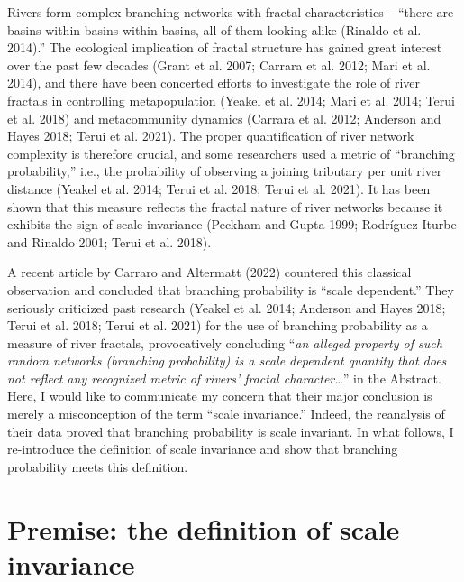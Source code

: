 \documentclass[
  12pt,
]{article}
\begin{document}
Rivers form complex branching networks with fractal characteristics -- ``there are basins within basins within basins, all of them looking alike (Rinaldo et al. 2014).'' The ecological implication of fractal structure has gained great interest over the past few decades (Grant et al. 2007; Carrara et al. 2012; Mari et al. 2014), and there have been concerted efforts to investigate the role of river fractals in controlling metapopulation (Yeakel et al. 2014; Mari et al. 2014; Terui et al. 2018) and metacommunity dynamics (Carrara et al. 2012; Anderson and Hayes 2018; Terui et al. 2021). The proper quantification of river network complexity is therefore crucial, and some researchers used a metric of ``branching probability,'' i.e., the probability of observing a joining tributary per unit river distance (Yeakel et al. 2014; Terui et al. 2018; Terui et al. 2021). It has been shown that this measure reflects the fractal nature of river networks because it exhibits the sign of scale invariance (Peckham and Gupta 1999; Rodríguez-Iturbe and Rinaldo 2001; Terui et al. 2018).

A recent article by Carraro and Altermatt (2022) countered this classical observation and concluded that branching probability is ``scale dependent.'' They seriously criticized past research (Yeakel et al. 2014; Anderson and Hayes 2018; Terui et al. 2018; Terui et al. 2021) for the use of branching probability as a measure of river fractals, provocatively concluding ``\emph{an alleged property of such random networks (branching probability) is a scale dependent quantity that does not reflect any recognized metric of rivers' fractal character\ldots{}}'' in the Abstract. Here, I would like to communicate my concern that their major conclusion is merely a misconception of the term ``scale invariance.'' Indeed, the reanalysis of their data proved that branching probability is scale invariant. In what follows, I re-introduce the definition of scale invariance and show that branching probability meets this definition.

\hypertarget{premise-the-definition-of-scale-invariance}{%
\section{Premise: the definition of scale invariance}\label{premise-the-definition-of-scale-invariance}}
\end{document}
